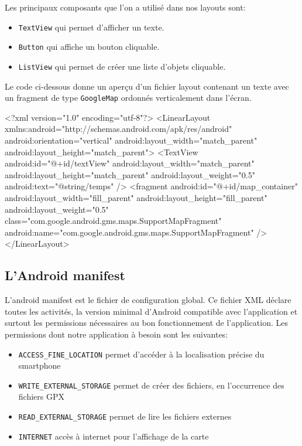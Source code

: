 Les principaux composants que l'on a utilisé dans nos layouts sont:\bigskip

\begin{itemize}
 	\item \verb!TextView! qui permet d'afficher un texte.
 	\item \verb!Button! qui affiche un bouton cliquable.
 	\item \verb!ListView! qui permet de créer une liste d'objets cliquable.
\end{itemize}\bigskip
 
Le code ci-dessous donne un aperçu d'un fichier layout contenant un texte avec un fragment de type \verb!GoogleMap! ordonnés verticalement dans l'écran.
\begin{xml}
<?xml version="1.0" encoding="utf-8"?>
<LinearLayout xmlns:android="http://schemas.android.com/apk/res/android"
    android:orientation="vertical" android:layout_width="match_parent"
    android:layout_height="match_parent">	
	<TextView
		android:id="@+id/textView"
    	android:layout_width="match_parent"
        android:layout_height="match_parent"        
        android:layout_weight="0.5"
        android:text="@string/temps" />
    <fragment
        android:id="@+id/map_container"
        android:layout_width="fill_parent"
        android:layout_height="fill_parent"
        android:layout_weight="0.5"
        class="com.google.android.gms.maps.SupportMapFragment"
        android:name="com.google.android.gms.maps.SupportMapFragment" />
</LinearLayout>
\end{xml}
\subsection{L'Android manifest}
\label{manifest}
L'android manifest est le fichier de configuration global. Ce fichier XML déclare toutes les activités, la version minimal d'Android compatible avec l'application et surtout les permissions nécessaires au bon fonctionnement de l'application. Les permissions dont notre application à besoin sont les suivantes:\bigskip

\begin{itemize}
 	\item \verb!ACCESS_FINE_LOCATION! permet d'accéder à la localisation précise du smartphone
 	\item \verb!WRITE_EXTERNAL_STORAGE! permet de créer des fichiers, en l'occurrence des fichiers GPX
 	\item \verb!READ_EXTERNAL_STORAGE! permet de lire les fichiers externes
 	\item \verb!INTERNET! accès à internet pour l'affichage de la carte
\end{itemize}\bigskip

